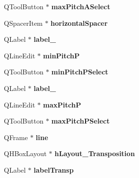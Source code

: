 \begin{DoxyCompactItemize}
Q\+Tool\+Button $\ast$ {\bfseries max\+Pitch\+A\+Select}
\item 
\mbox{\label{class_ui___edit_staff_base_a2152685985879f456f6b75c829a9d223}} 
Q\+Spacer\+Item $\ast$ {\bfseries horizontal\+Spacer}
\item 
\mbox{\label{class_ui___edit_staff_base_a0f97bad0660ed8bf833daf7fb68f0c53}} 
Q\+Label $\ast$ {\bfseries label\+\_}
\item 
\mbox{\label{class_ui___edit_staff_base_a6a49459b60badd356514003e57fa02d9}} 
Q\+Line\+Edit $\ast$ {\bfseries min\+PitchP}
\item 
\mbox{\label{class_ui___edit_staff_base_a07309212f118be1e854813a202ea319c}} 
Q\+Tool\+Button $\ast$ {\bfseries min\+Pitch\+P\+Select}
\item 
\mbox{\label{class_ui___edit_staff_base_a899acbb71228bbaa5c8546ca894e32bf}} 
Q\+Label $\ast$ {\bfseries label\+\_}
\item 
\mbox{\label{class_ui___edit_staff_base_a8e888871e1a618904154437f81636d33}} 
Q\+Line\+Edit $\ast$ {\bfseries max\+PitchP}
\item 
\mbox{\label{class_ui___edit_staff_base_a7f79df63c31d60381c9420ab47819b11}} 
Q\+Tool\+Button $\ast$ {\bfseries max\+Pitch\+P\+Select}
\item 
\mbox{\label{class_ui___edit_staff_base_a031426ef83ceb1d312de954fe81309db}} 
Q\+Frame $\ast$ {\bfseries line}
\item 
\mbox{\label{class_ui___edit_staff_base_ac6db4912877d61fdeef01031608a03b5}} 
Q\+H\+Box\+Layout $\ast$ {\bfseries h\+Layout\+\_\+\+Transposition}
\item 
\mbox{\label{class_ui___edit_staff_base_a6f9aec818bef6b226dd247197b2f257c}} 
Q\+Label $\ast$ {\bfseries label\+Transp}
\item 
\mbox{\label{class_ui___edit_staff_base_a51653744f79bfc31d0c19a4ab8fa59f2}} 

\end{DoxyCompactItemize}
